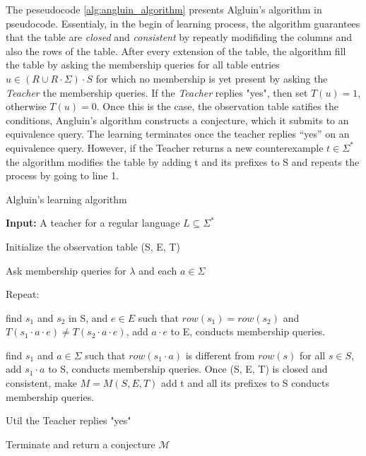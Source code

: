 The peseudocode \ref{alg:angluin_algorithm} presents Algluin's algorithm in pseudocode.
Essentialy, in the begin of learning process, the algorithm guarantees that the table are \textit{closed}
and \textit{consistent} by repeatly modifiding the columns and also the rows of the table.
After every extension of the table,
the algorithm fill the table by asking the membership queries for all table entries 
$u \in (R \cup R \cdot \Sigma) \cdot S$ for which no membership is yet present by asking the \textit{Teacher} the membership queries. If the \textit{Teacher} replies "yes",
then set $T(u) = 1$, otherwise  $T(u) = 0$.
Once this is the case, the observation table satifies the conditions, Angluin’s algorithm constructs a conjecture, which it submits
to an equivalence query. The learning terminates once the teacher replies “yes” on
an equivalence query.
However, if the Teacher returns a new counterexample $t \in \Sigma^*$ the algorithm modifies the table 
by adding t and its prefixes to S and repeats the process by going to line 1.
\begin{algorithm}
    \caption{Algluin's learning algorithm \cite{ANGLUIN198787}}\label{alg:angluin_algorithm}
    \textbf{Input: } A teacher for a regular language $L \subseteq \Sigma^*$
    
    Initialize the observation table (S, E, T)
    
    Ask membership queries for $\lambda$ and each $a \in \Sigma$
    
    Repeat:
        \begin{algorithmic}[1]
                    \State find $s_1$ and $s_2$ in S, and $e \in E$ such that                 
                    \State $row(s_1) = row(s_2)$ and $T(s_1 \cdot a \cdot e) \neq T(s_2 \cdot a \cdot e)$,            
                    \State add $a \cdot e$ to E,      
                    \State conducts membership queries.
                \EndIf

                    \State find $s_1$ and $a \in \Sigma $ such that             
                    \State $row(s_1 \cdot a)$ is different from $row(s)$ for all $s \in S$,            
                    \State add $s_1 \cdot a$ to S,      
                    \State conducts membership queries.
                \EndIf
            \EndWhile
            \State Once (S, E, T) is closed and consistent, make $M = M(S,E,T)$
                    \State add t and all its prefixes to S         
                    \State conducts membership queries.
                \EndIf
        \end{algorithmic}
    Util the Teacher replies "yes"

    Terminate and return a conjecture $\mathcal{M}$
    \end{algorithm}

